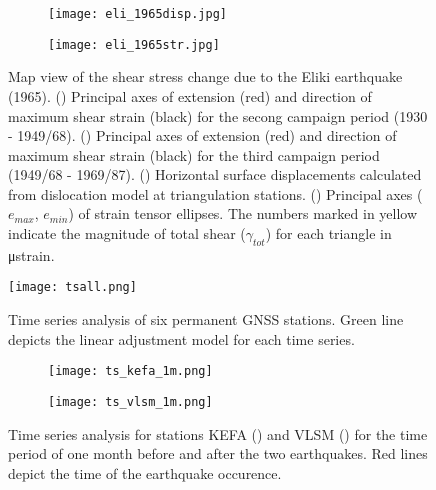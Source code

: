 \begin{extsum}
\begin{figure}[H]
\begin{subfigure}{.49\textwidth}
  \centering
      \texttt{[image: eli\_1965disp.jpg]}
      \caption{}
      \label{fig_e:eli_1965disp}
\end{subfigure}
\begin{subfigure}{.49\textwidth}
\centering
      \texttt{[image: eli\_1965str.jpg]}
      \caption{}
      \label{fig_e:eli_1965str}
\end{subfigure}
\caption{Map view of the shear stress change due to the Eliki 
earthquake (1965). () Principal axes of extension (red) 
and direction of maximum shear strain (black) for the secong campaign period 
(1930 - 1949/68). () Principal axes of extension (red) 
and direction of maximum shear strain (black) for the third campaign period 
(1949/68 - 1969/87). () Horizontal surface 
displacements calculated from \citet{Okada1985} dislocation model at 
triangulation stations. () Principal axes (${e}_{max}$, 
${e}_{min}$) of strain tensor ellipses. The numbers marked in yellow indicate 
the magnitude of total shear ($\gamma_{tot}$) for each triangle in μstrain.}
\label{fig_e:eli_1965}
\end{figure}

\begin{figure}[H]
  \begin{center}
    \texttt{[image: tsall.png]}
    \caption{Time series analysis of six permanent GNSS stations. Green line depicts the linear adjustment model for each time series.}
    \label{fig_e:tsallkefa}
  \end{center}
\end{figure}

\begin{figure}[H]
\centering
\begin{subfigure}{.49\textwidth}
  \centering
      \texttt{[image: ts\_kefa\_1m.png]}
      \caption{}
      \label{fig_e:ts_kefa_1m}
\end{subfigure}
\begin{subfigure}{.49\textwidth}
\centering
      \texttt{[image: ts\_vlsm\_1m.png]}
      \caption{}
      \label{fig_e:ts_vlsm_1m}
\end{subfigure}
\caption{Time series analysis for stations KEFA () and VLSM () for the time period of one month before and after the two earthquakes. Red lines depict the time of the earthquake occurence.}
\label{fig_e:ts_1m}
\end{figure}


\end{extsum}
